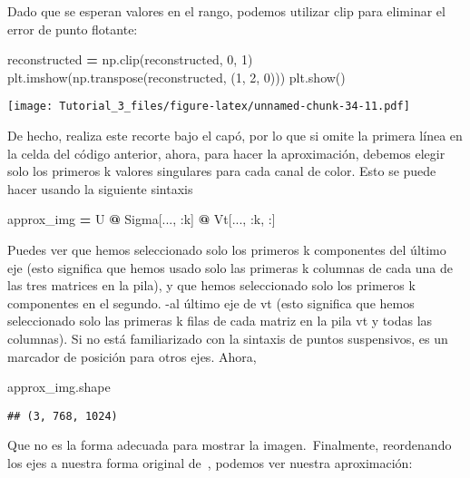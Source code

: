 \documentclass[
]{article}
\newenvironment{Shaded}{\begin{snugshade}}{\end{snugshade}}
\newcommand{\DecValTok}[1]{\textcolor[rgb]{0.00,0.00,0.81}{#1}}
\newcommand{\NormalTok}[1]{#1}
\newcommand{\OperatorTok}[1]{\textcolor[rgb]{0.81,0.36,0.00}{\textbf{#1}}}
\begin{document}
Dado que se esperan valores en el rango, podemos utilizar clip para
eliminar el error de punto flotante:

\begin{Shaded}
\begin{Highlighting}[]
\NormalTok{reconstructed }\OperatorTok{=}\NormalTok{ np.clip(reconstructed, }\DecValTok{0}\NormalTok{, }\DecValTok{1}\NormalTok{)}
\NormalTok{plt.imshow(np.transpose(reconstructed, (}\DecValTok{1}\NormalTok{, }\DecValTok{2}\NormalTok{, }\DecValTok{0}\NormalTok{)))}
\NormalTok{plt.show()}
\end{Highlighting}
\end{Shaded}

\texttt{[image: Tutorial\_3\_files/figure-latex/unnamed-chunk-34-11.pdf]}

De hecho, realiza este recorte bajo el capó, por lo que si omite la
primera línea en la celda del código anterior, ahora, para hacer la
aproximación, debemos elegir solo los primeros k valores singulares para
cada canal de color. Esto se puede hacer usando la siguiente sintaxis

\begin{Shaded}
\begin{Highlighting}[]
\NormalTok{approx\_img }\OperatorTok{=}\NormalTok{ U }\OperatorTok{@}\NormalTok{ Sigma[..., :k] }\OperatorTok{@}\NormalTok{ Vt[..., :k, :]}
\end{Highlighting}
\end{Shaded}

Puedes ver que hemos seleccionado solo los primeros k componentes del
último eje (esto significa que hemos usado solo las primeras k columnas
de cada una de las tres matrices en la pila), y que hemos seleccionado
solo los primeros k componentes en el segundo. -al último eje de vt
(esto significa que hemos seleccionado solo las primeras k filas de cada
matriz en la pila vt y todas las columnas). Si no está familiarizado con
la sintaxis de puntos suspensivos, es un marcador de posición para otros
ejes. Ahora,

\begin{Shaded}
\begin{Highlighting}[]
\NormalTok{approx\_img.shape}
\end{Highlighting}
\end{Shaded}

\begin{verbatim}
## (3, 768, 1024)
\end{verbatim}

Que no es la forma adecuada para mostrar la imagen.~Finalmente,
reordenando los ejes a nuestra forma original de~, podemos ver nuestra
aproximación:
\end{document}
